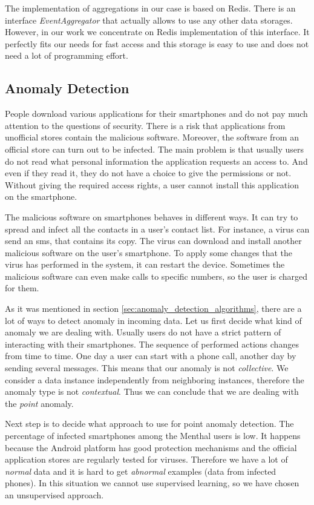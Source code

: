 The implementation of aggregations in our case is based on Redis.
There is an interface \textit{EventAggregator} that actually allows to use any other data storages.
However, in our work we concentrate on Redis implementation of this interface.
It perfectly fits our needs for fast access and this storage is easy to use and does not need a lot of programming effort.

\subsection{Anomaly Detection}

People download various applications for their smartphones and do not pay much attention to the questions of security.
There is a risk that applications from unofficial stores contain the malicious software.
Moreover, the software from an official store can turn out to be infected.
The main problem is that usually users do not read what personal information the application requests an access to.
And even if they read it, they do not have a choice to give the permissions or not.
Without giving the required access rights, a user cannot install this application on the smartphone.
   
The malicious software on smartphones behaves in different ways.
It can try to spread and infect all the contacts in a user's contact list.
For instance, a virus can send an sms, that contains its copy.
The virus can download and install another malicious software on the user's smartphone.
To apply some changes that the virus has performed in the system, it can restart the device.
Sometimes the malicious software can even make calls to specific numbers, so the user is charged for them.

As it was mentioned in section \ref{sec:anomaly_detection_algorithms}, there are a lot of ways to detect anomaly in incoming data.
Let us first decide what kind of anomaly we are dealing with.
Usually users do not have a strict pattern of interacting with their smartphones.
The sequence of performed actions changes from time to time.
One day a user can start with a phone call, another day by sending several messages.
This means that our anomaly is not \textit{collective}.
We consider a data instance independently from neighboring instances, therefore the anomaly type is not \textit{contextual}.
Thus we can conclude that we are dealing with the \textit{point} anomaly.

Next step is to decide what approach to use for point anomaly detection.
The percentage of infected smartphones among the Menthal users is low.
It happens because the Android platform has good protection mechanisms and the official application stores are regularly tested for viruses.
Therefore we have a lot of \textit{normal} data and it is hard to get \textit{abnormal} examples (data from infected phones).
In this situation we cannot use supervised learning, so we have chosen an unsupervised approach.

